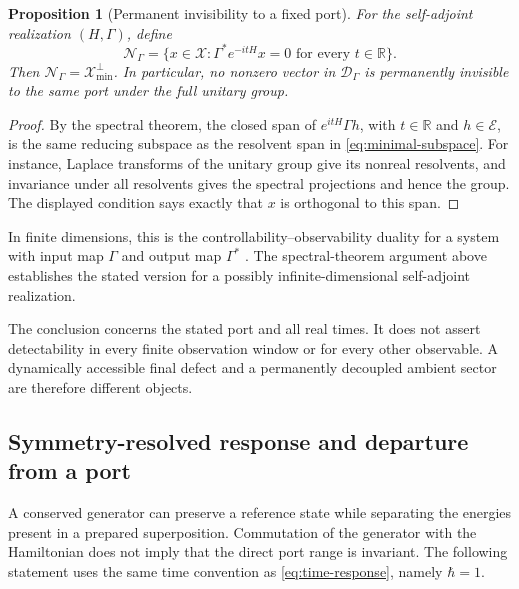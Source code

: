 \documentclass[11pt,reqno]{scrartcl}
\newcommand{\RR}{\mathbb R}
\newcommand{\scrX}{\mathscr X}
\newcommand{\scrE}{\mathscr E}
\newcommand{\Hmin}{\mathscr X_{\min}}
\theoremstyle{plain}
\newtheorem{proposition}[proposition]{Proposition}
\theoremstyle{definition}
\theoremstyle{remark}
\begin{document}
\begin{proposition}[Permanent invisibility to a fixed port]
\label{prop:permanent-port-invisibility}
For the self-adjoint realization $(H,\Gamma)$, define
\begin{equation}
 \mathcal N_\Gamma
 =\{x\in\scrX:\Gamma^*e^{-itH}x=0
                 \text{ for every }t\in\RR\}.
\end{equation}
Then $\mathcal N_\Gamma=\Hmin^\perp$.  In particular, no nonzero
vector in $\mathcal D_\Gamma$ is permanently invisible to the same
port under the full unitary group.
\end{proposition}
\begin{proof}
By the spectral theorem, the closed span of
$e^{itH}\Gamma h$, with $t\in\RR$ and $h\in\scrE$, is the same
reducing subspace as the resolvent span in
\eqref{eq:minimal-subspace}.  For instance, Laplace transforms of
the unitary group give its nonreal resolvents, and invariance under
all resolvents gives the spectral projections and hence the group.
The displayed condition says exactly that $x$ is orthogonal to
this span.
\end{proof}

In finite dimensions, this is the controllability--observability
duality for a system with input map $\Gamma$ and output map
$\Gamma^*$ \cite[Sec.~5]{Kalman1963}.  The spectral-theorem argument
above establishes the stated version for a possibly
infinite-dimensional self-adjoint realization.

The conclusion concerns the stated port and all real times.  It
does not assert detectability in every finite observation window
or for every other observable.  A dynamically accessible final
defect and a permanently decoupled ambient sector are therefore
different objects.


\subsection{Symmetry-resolved response and departure from a port}
\label{sec:symmetry-response}

A conserved generator can preserve a reference state while separating the
energies present in a prepared superposition.  Commutation of the generator
with the Hamiltonian does not imply that the direct port range is invariant.
The following statement uses the same time convention as
\eqref{eq:time-response}, namely $\hbar=1$.
\end{document}
